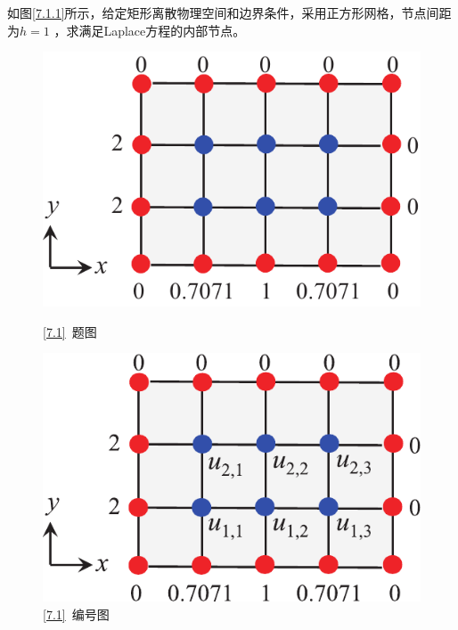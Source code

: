 \examples \label{7.1}如图\ref{7.1.1}所示，给定矩形离散物理空间和边界条件，采用正方形网格，节点间距为$h =1$ ，求满足Laplace方程的内部节点。
\vspace*{-0.5em}
\begin{figure}[!htb]
	\begin{minipage}{0.5\linewidth}
		\centering
		\includegraphics[width=0.6\linewidth]{pic/差分例1-1.pdf}
		\vspace*{-1em}
		\caption{\ref{7.1} $\,$题图}
		\label{7.1.1}
	\end{minipage}
	\begin{minipage}{0.5\linewidth}
		\centering
		\includegraphics[width=0.6\linewidth]{pic/差分例1-2.pdf}
		\vspace*{-0.6em}
		\caption{\ref{7.1} $\,$编号图}
		\label{7.1.2}
	\end{minipage}
\end{figure}
\vspace*{-0.8em}

